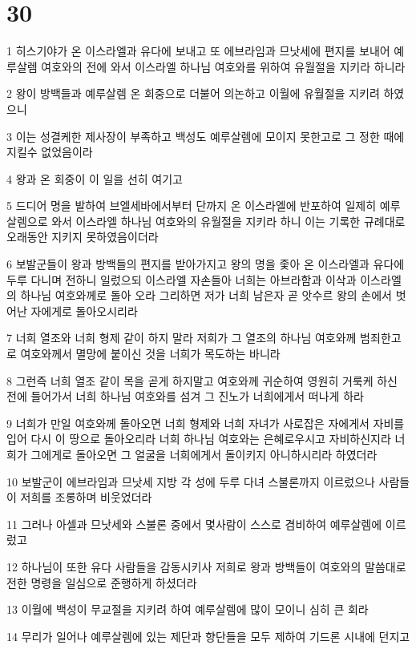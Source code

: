 \chapter{30}

\par 1 히스기야가 온 이스라엘과 유다에 보내고 또 에브라임과 므낫세에 편지를 보내어 예루살렘 여호와의 전에 와서 이스라엘 하나님 여호와를 위하여 유월절을 지키라 하니라
\par 2 왕이 방백들과 예루살렘 온 회중으로 더불어 의논하고 이월에 유월절을 지키려 하였으니
\par 3 이는 성결케한 제사장이 부족하고 백성도 예루살렘에 모이지 못한고로 그 정한 때에 지킬수 없었음이라
\par 4 왕과 온 회중이 이 일을 선히 여기고
\par 5 드디어 명을 발하여 브엘세바에서부터 단까지 온 이스라엘에 반포하여 일제히 예루살렘으로 와서 이스라엘 하나님 여호와의 유월절을 지키라 하니 이는 기록한 규례대로 오래동안 지키지 못하였음이더라
\par 6 보발군들이 왕과 방백들의 편지를 받아가지고 왕의 명을 좇아 온 이스라엘과 유다에 두루 다니며 전하니 일렀으되 이스라엘 자손들아 너희는 아브라함과 이삭과 이스라엘의 하나님 여호와께로 돌아 오라 그리하면 저가 너희 남은자 곧 앗수르 왕의 손에서 벗어난 자에게로 돌아오시리라
\par 7 너희 열조와 너희 형제 같이 하지 말라 저희가 그 열조의 하나님 여호와께 범죄한고로 여호와께서 멸망에 붙이신 것을 너희가 목도하는 바니라
\par 8 그런즉 너희 열조 같이 목을 곧게 하지말고 여호와께 귀순하여 영원히 거룩케 하신 전에 들어가서 너희 하나님 여호와를 섬겨 그 진노가 너희에게서 떠나게 하라
\par 9 너희가 만일 여호와께 돌아오면 너희 형제와 너희 자녀가 사로잡은 자에게서 자비를 입어 다시 이 땅으로 돌아오리라 너희 하나님 여호와는 은혜로우시고 자비하신지라 너희가 그에게로 돌아오면 그 얼굴을 너희에게서 돌이키지 아니하시리라 하였더라
\par 10 보발군이 에브라임과 므낫세 지방 각 성에 두루 다녀 스불론까지 이르렀으나 사람들이 저희를 조롱하며 비웃었더라
\par 11 그러나 아셀과 므낫세와 스불론 중에서 몇사람이 스스로 겸비하여 예루살렘에 이르렀고
\par 12 하나님이 또한 유다 사람들을 감동시키사 저희로 왕과 방백들이 여호와의 말씀대로 전한 명령을 일심으로 준행하게 하셨더라
\par 13 이월에 백성이 무교절을 지키려 하여 예루살렘에 많이 모이니 심히 큰 회라
\par 14 무리가 일어나 예루살렘에 있는 제단과 향단들을 모두 제하여 기드론 시내에 던지고
